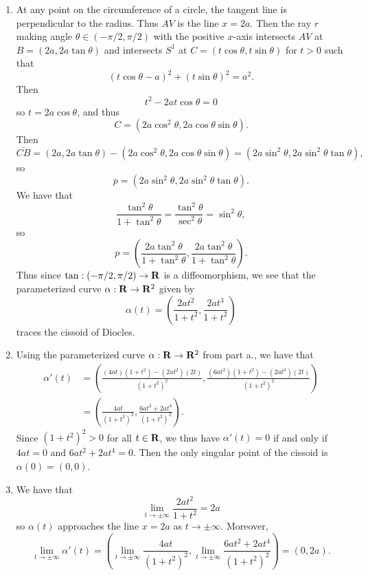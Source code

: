 \begin{ex}
\begin{enumerate}
\item At any point on the circumference of a circle, the tangent line is perpendicular to the radius. Thus $AV$ is the line $x = 2a$. Then the ray $r$ making angle $\theta \in (-\pi/2, \pi/2)$ with the positive $x$-axis intersects $AV$ at $B = (2a, 2a\tan\theta)$ and intersects $S^1$ at $C = (t\cos\theta, t\sin\theta)$ for $t > 0$ such that \[(t\cos\theta - a)^2 + (t\sin\theta)^2 = a^2.\] Then \[t^2-2at\cos\theta = 0\] so $t = 2a\cos\theta$, and thus \[C = (2a\cos^2\theta, 2a\cos\theta\sin\theta).\] Then \[\bar{CB} = (2a, 2a\tan\theta) - (2a\cos^2\theta, 2a\cos\theta\sin\theta) = (2a\sin^2\theta, 2a\sin^2\theta\tan\theta),\] so \[p = (2a\sin^2\theta, 2a\sin^2\theta\tan\theta).\] We have that \[\frac{\tan^2\theta}{1 + \tan^2\theta} = \frac{\tan^2\theta}{\sec^2\theta} = \sin^2\theta,\] so \[p = \left(\frac{2a\tan^2\theta}{1 + \tan^2\theta}, \frac{2a\tan^2\theta}{1 + \tan^2\theta}\right).\] Thus since $\tan: (-\pi/2, \pi/2) \to \mathbf{R}$ is a diffeomorphism, we see that the parameterized curve $\alpha: \mathbf{R} \to \mathbf{R}^2$ given by \[\alpha(t) = \left(\frac{2at^2}{1+t^2}, \frac{2at^3}{1+t^2}\right)\] traces the cissoid of Diocles.

\item Using the parameterized curve $\alpha: \mathbf{R} \to \mathbf{R}^2$ from part a., we have that
\begin{align*}
\alpha'(t) & = \left(\frac{(4at)(1+t^2) - (2at^2)(2t)}{(1+t^2)^2}, \frac{(6at^2)(1+t^2) - (2at^3)(2t)}{(1+t^2)^2}\right)\\
& = \left(\frac{4at}{(1+t^2)^2}, \frac{6at^2 + 2at^4}{(1+t^2)^2}\right).
\end{align*}
Since $(1+t^2)^2 > 0$ for all $t \in \mathbf{R}$, we thus have $\alpha'(t) = 0$ if and only if $4at = 0$ and $6at^2 + 2at^4 = 0$. Then the only singular point of the cissoid is $\alpha(0) = (0, 0)$.

\item We have that \[\lim_{t\to\pm\infty}\frac{2at^2}{1+t^2} = 2a\] so $\alpha(t)$ approaches the line $x = 2a$ as $t\to\pm\infty$. Moreover, \[\lim_{t\to\pm\infty}\alpha'(t) = \left(\lim_{t\to\pm\infty}\frac{4at}{(1+t^2)^2}, \lim_{t\to\pm\infty}\frac{6at^2+2at^4}{(1+t^2)^2}\right) = (0, 2a).\]
\end{enumerate}
\end{ex}

